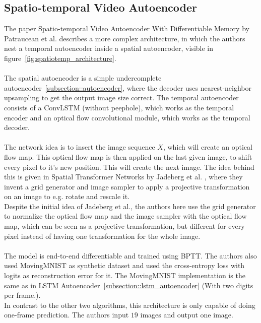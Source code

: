  \subsection{Spatio-temporal Video Autoencoder}
  The paper \glqq Spatio-temporal Video Autoencoder With Differentiable Memory\grqq{} by Patraucean et al. \cite{Patraucean2015} describes a more complex 
  architecture, in which the authors
  nest a temporal autoencoder inside a spatial autoencoder, visible in figure~\ref{fig:spatiotemp_architecture}.
  \\\\  
  The spatial autoencoder is a simple undercomplete autoencoder~\ref{subsection::autoencoder}, where the decoder uses nearest-neighbor
  upsampling to get the output image size correct. The temporal autoencoder consists of a ConvLSTM (without peephole), which works as the temporal 
  encoder and an optical flow convolutional module, which works
  as the temporal decoder.
  \\\\
  The network idea is to insert the image sequence $X$, which will create an optical flow map. This optical flow map is then applied on the last given image, to 
  shift every pixel to it's new position. This will create the next image. The idea behind this is given in \glqq Spatial Transformer Networks\grqq{} by Jadeberg et 
  al. \cite{Jadeberg2015}, where they invent a grid generator and image sampler to apply a projective transformation on an image to e.g. rotate and rescale it.\\
  Despite the initial idea
  of Jadeberg et al., the authors here use the grid generator to normalize the optical flow map and the image sampler with the optical flow map, which can be seen 
  as a projective transformation, but different for every pixel instead of having one transformation for the whole image.
  \\\\
  The model is end-to-end differentiable and trained using BPTT. The authors also used MovingMNIST as synthetic dataset and used the cross-entropy loss with 
  logits as reconstruction error for it. The 
  MovingMNIST implementation is the same as in LSTM Autoencoder~\ref{subsection::lstm_autoencoder} (With two digits per frame.).
  \\
  In contrast to the other two algorithms, this architecture is only capable of doing one-frame prediction. The authors input $19$ images and output one 
  image.
  \\\\
